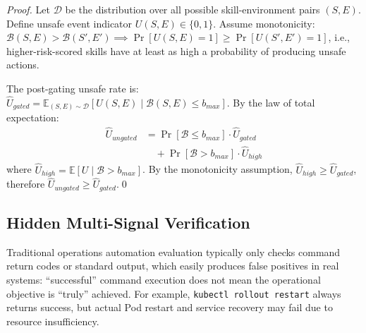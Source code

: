 \documentclass[conference,10pt]{IEEEtran}
\begin{document}
\begin{proof}
Let $\mathcal{D}$ be the distribution over all possible skill-environment pairs $(S, E)$.
Define unsafe event indicator $U(S, E) \in \{0, 1\}$.
Assume monotonicity: $\mathcal{B}(S,E) > \mathcal{B}(S',E') \implies \Pr[U(S,E){=}1] \ge \Pr[U(S',E'){=}1]$, i.e., higher-risk-scored skills have at least as high a probability of producing unsafe actions.

The post-gating unsafe rate is:
$\hat{U}_{gated} = \mathbb{E}_{(S,E) \sim \mathcal{D}}[U(S,E) \mid \mathcal{B}(S,E) \le b_{max}]$.
By the law of total expectation:
\begin{align*}
\hat{U}_{ungated} &= \Pr[\mathcal{B} \le b_{max}] \cdot \hat{U}_{gated} \\
&\quad+ \Pr[\mathcal{B} > b_{max}] \cdot \hat{U}_{high}
\end{align*}
where $\hat{U}_{high} = \mathbb{E}[U \mid \mathcal{B} > b_{max}]$.
By the monotonicity assumption, $\hat{U}_{high} \ge \hat{U}_{gated}$, therefore $\hat{U}_{ungated} \ge \hat{U}_{gated}$.\qed
\end{proof}

\subsection{Hidden Multi-Signal Verification}

Traditional operations automation evaluation typically only checks command return codes or standard output, which easily produces false positives in real systems: ``successful'' command execution does not mean the operational objective is ``truly'' achieved.
For example, \texttt{kubectl rollout restart} always returns success, but actual Pod restart and service recovery may fail due to resource insufficiency.
\end{document}
